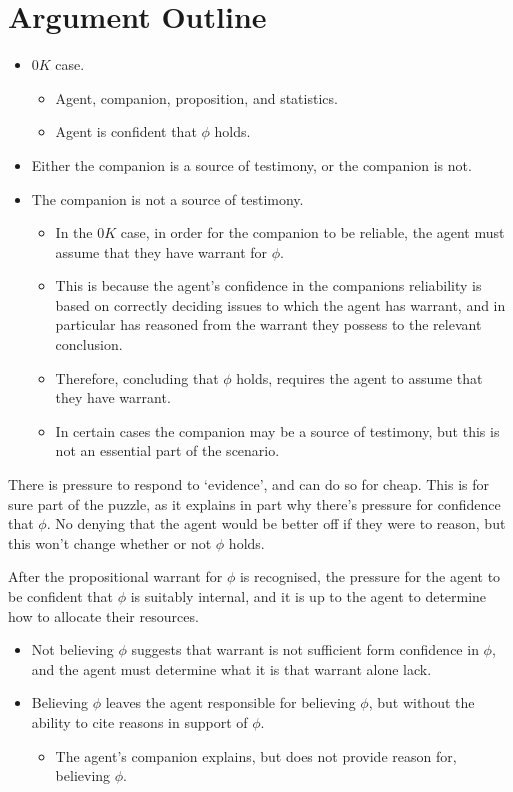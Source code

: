 \documentclass[10pt]{article}
\begin{document}
\section{Argument Outline}
\label{sec:argument-outline}

\begin{itemize}
\item \(0K\) case.
  \begin{itemize}
  \item Agent, companion, proposition, and statistics.
  \item Agent is confident that \(\phi\) holds.
  \end{itemize}
\item Either the companion is a source of testimony, or the companion is not.
\item The companion is not a source of testimony.
  \begin{itemize}
  \item In the \(0K\) case, in order for the companion to be reliable, the agent must assume that they have warrant for \(\phi\).
  \item This is because the agent's confidence in the companions reliability is based on correctly deciding issues to which the agent has warrant, and in particular has reasoned from the warrant they possess to the relevant conclusion.
  \item Therefore, concluding that \(\phi\) holds, requires the agent to assume that they have warrant.

  \item In certain cases the companion may be a source of testimony, but this is not an essential part of the scenario.
  \end{itemize}
\end{itemize}

There is pressure to respond to `evidence', and can do so for cheap.
This is for sure part of the puzzle, as it explains in part why there's pressure for confidence that \(\phi\).
No denying that the agent would be better off if they were to reason, but this won't change whether or not \(\phi\) holds.




After the propositional warrant for \(\phi\) is recognised, the pressure for the agent to be confident that \(\phi\) is suitably internal, and it is up to the agent to determine how to allocate their resources.
\begin{itemize}
\item Not believing \(\phi\) suggests that warrant is not sufficient form confidence in \(\phi\), and the agent must determine what it is that warrant alone lack.
\item Believing \(\phi\) leaves the agent responsible for believing \(\phi\), but without the ability to cite reasons in support of \(\phi\).
  \begin{itemize}
  \item The agent's companion explains, but does not provide reason for, believing \(\phi\).
  \end{itemize}
\end{itemize}
\end{document}
